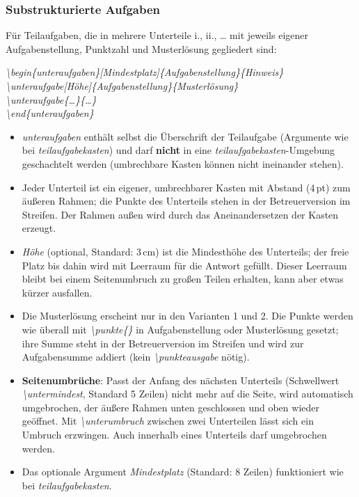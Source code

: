 \documentclass[../main.tex]{subfiles}
\begin{document}
\subsubsection{Substrukturierte Aufgaben}
F\"ur Teilaufgaben, die in mehrere Unterteile i., ii., \dots{} mit jeweils eigener Aufgabenstellung, Punktzahl und Musterl\"osung gegliedert sind:
\begin{center}
\textit{\hypertarget{unteraufgaben}{\textbackslash begin\{unteraufgaben\}[Mindestplatz]\{Aufgabenstellung\}\{Hinweis\}}\\
\hypertarget{unteraufgabe}{\textbackslash unteraufgabe[H\"ohe]\{Aufgabenstellung\}\{Musterl\"osung\}}\\
\textbackslash unteraufgabe\{\dots\}\{\dots\}\\
\textbackslash end\{unteraufgaben\}}
\end{center}
\begin{itemize}
    \item \textit{unteraufgaben} enth\"alt selbst die \"Uberschrift der Teilaufgabe (Argumente wie bei \textit{teilaufgabekasten}) und darf \textbf{nicht} in eine \textit{teilaufgabekasten}-Umgebung geschachtelt werden (umbrechbare Kasten k\"onnen nicht ineinander stehen).
    \item Jeder Unterteil ist ein eigener, umbrechbarer Kasten mit Abstand (4\,pt) zum \"au\ss{}eren Rahmen; die Punkte des Unterteils stehen in der Betreuerversion im Streifen. Der Rahmen au\ss{}en wird durch das Aneinandersetzen der Kasten erzeugt.
    \item \textit{H\"ohe} (optional, Standard: 3\,cm) ist die Mindesth\"ohe des Unterteils; der freie Platz bis dahin wird mit Leerraum f\"ur die Antwort gef\"ullt. Dieser Leerraum bleibt bei einem Seitenumbruch zu gro\ss{}en Teilen erhalten, kann aber etwas k\"urzer ausfallen.
    \item Die Musterl\"osung erscheint nur in den Varianten 1 und 2. Die Punkte werden wie \"uberall mit \textit{\textbackslash punkte\{\}} in Aufgabenstellung oder Musterl\"osung gesetzt; ihre Summe steht in der Betreuerversion im Streifen und wird zur Aufgabensumme addiert (kein \textit{\textbackslash punkteausgabe} n\"otig).
    \item \textbf{Seitenumbr\"uche}: Passt der Anfang des n\"achsten Unterteils (Schwellwert \textit{\textbackslash untermindest}, Standard 5 Zeilen) nicht mehr auf die Seite, wird automatisch umgebrochen, der \"au\ss{}ere Rahmen unten geschlossen und oben wieder ge\"offnet. Mit \textit{\hypertarget{unterumbruch}{\textbackslash unterumbruch}} zwischen zwei Unterteilen l\"asst sich ein Umbruch erzwingen. Auch innerhalb eines Unterteils darf umgebrochen werden.
    \item Das optionale Argument \textit{Mindestplatz} (Standard: 8 Zeilen) funktioniert wie bei \textit{teilaufgabekasten}.
\end{itemize}
\end{document}
